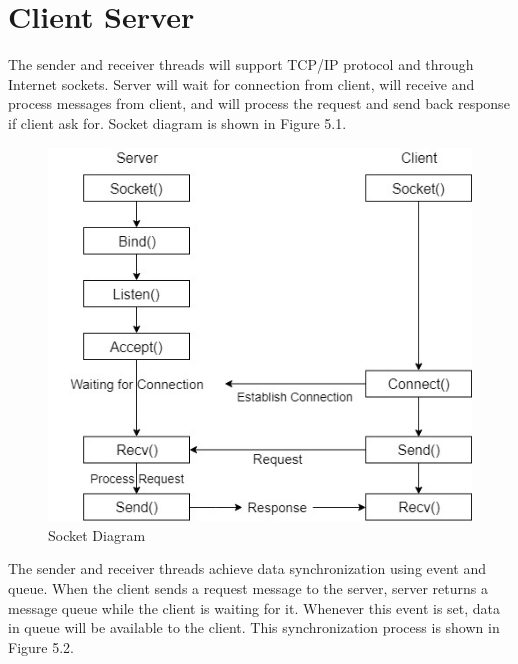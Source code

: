 \chapter{Client Server}
\label{chap:client server}


The sender and receiver threads will support TCP/IP protocol and through Internet sockets. Server will wait for connection from client, will receive and process messages from client, and will process the request and send back response if client ask for. Socket diagram is shown in Figure 5.1.

\begin{figure}[h!]
\centering
\includegraphics[scale=0.5]{client_server/images/socket.jpg}
\caption{Socket Diagram}
\label{fig:socket}
\end{figure}

The sender and receiver threads achieve data synchronization using event and queue. When the client sends a request message to the server, server returns a message queue while the client is waiting for it. Whenever this event is set, data in queue  will be available to the client. This synchronization process is shown in Figure 5.2.

